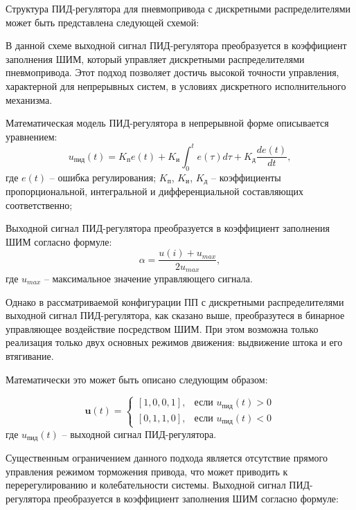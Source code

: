 Структура ПИД-регулятора для пневмопривода
с дискретными распределителями может быть представлена следующей схемой:
\begin{figure}[ht]
	\label{fig:ch3:pid_pwm_control}
\end{figure}
В данной схеме выходной сигнал ПИД-регулятора преобразуется в коэффициент
заполнения ШИМ, который управляет дискретными распределителями
пневмопривода. Этот подход позволяет достичь высокой точности
управления, характерной для непрерывных систем, в условиях
дискретного исполнительного механизма.

Математическая модель ПИД-регулятора в непрерывной форме описывается уравнением:
\begin{equation}\label{eq:pid_base}
	u_{\text{пид}}(t) = K_{\text{п}} e(t) + K_{\text{и}} \int_0^t e(\tau)d\tau + K_{\text{д}}\frac{de(t)}{dt},
\end{equation}
где
$e(t)$ -- ошибка регулирования;
$K_\text{п}$, $K_\text{и}$, $K_\text{д}$ -- коэффициенты пропорциональной, интегральной и
дифференциальной составляющих соответственно;

Выходной сигнал ПИД-регулятора преобразуется в коэффициент заполнения ШИМ согласно формуле:
\begin{equation*}
	\alpha = \frac{u(i) + u_{max}}{2u_{max}},
\end{equation*}
где $u_{max}$ -- максимальное значение управляющего сигнала.

Однако в рассматриваемой конфигурации ПП с дискретными распределителями
выходной сигнал ПИД-регулятора, как сказано выше, преобразутеся в бинарное
управляющее воздействие посредством ШИМ. При этом возможна только реализация
только двух основных режимов движения: выдвижение штока и его втягивание.

Математически это может быть описано следующим образом:

\begin{equation*}
	\mathbf{u}(t) = \begin{cases}
		[1,0,0,1], & \text{если } u_\text{пид}(t) > 0 \\
		[0,1,1,0], & \text{если } u_\text{пид}(t) < 0
	\end{cases}
\end{equation*}
где $u_\text{пид}(t)$ -- выходной сигнал ПИД-регулятора.

Существенным ограничением данного подхода является отсутствие
прямого управления режимом торможения привода, что может приводить к
перерегулированию и колебательности системы. Выходной сигнал ПИД-регулятора
преобразуется в коэффициент заполнения ШИМ согласно формуле:

